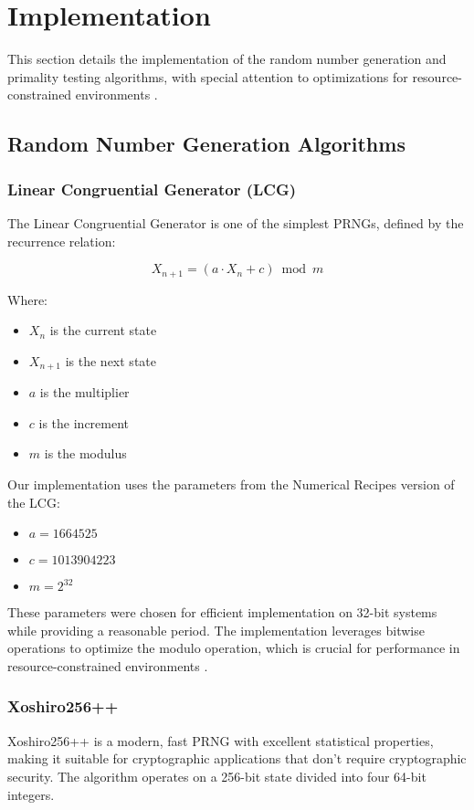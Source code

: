 \section{Implementation}

This section details the implementation of the random number generation and primality testing algorithms, with special attention to optimizations for resource-constrained environments \cite{energy_efficient, iot_survey}.

\subsection{Random Number Generation Algorithms}

\subsubsection{Linear Congruential Generator (LCG)}
The Linear Congruential Generator is one of the simplest PRNGs, defined by the recurrence relation:

\begin{equation}
X_{n+1} = (a \cdot X_n + c) \bmod m
\end{equation}

Where:
\begin{itemize}
    \item $X_n$ is the current state
    \item $X_{n+1}$ is the next state
    \item $a$ is the multiplier
    \item $c$ is the increment
    \item $m$ is the modulus
\end{itemize}

Our implementation uses the parameters from the Numerical Recipes version of the LCG:
\begin{itemize}
    \item $a = 1664525$
    \item $c = 1013904223$
    \item $m = 2^{32}$
\end{itemize}

These parameters were chosen for efficient implementation on 32-bit systems while providing a reasonable period. The implementation leverages bitwise operations to optimize the modulo operation, which is crucial for performance in resource-constrained environments \cite{energy_efficient}.

\subsubsection{Xoshiro256++}
Xoshiro256++ is a modern, fast PRNG with excellent statistical properties, making it suitable for cryptographic applications that don't require cryptographic security. The algorithm operates on a 256-bit state divided into four 64-bit integers.


